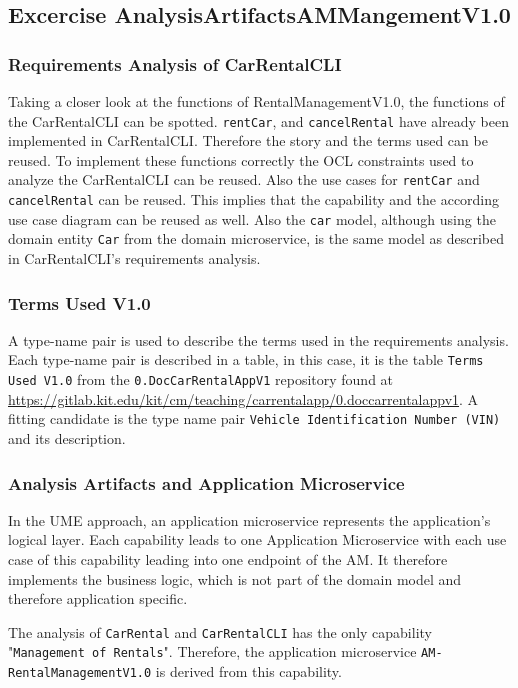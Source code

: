 \subsection{Excercise AnalysisArtifactsAMMangementV1.0}
\subsubsection*{Requirements Analysis of CarRentalCLI}
Taking a closer look at the functions of RentalManagementV1.0, the functions of the CarRentalCLI can be spotted.
\texttt{rentCar}, and \texttt{cancelRental} have already been implemented in CarRentalCLI.
Therefore the story and the terms used can be reused.
To implement these functions correctly the OCL constraints used to analyze the CarRentalCLI can be reused.
Also the use cases for \texttt{rentCar} and \texttt{cancelRental} can be reused.
This implies that the capability and the according use case diagram can be reused as well.
Also the \texttt{car} model, although using the domain entity \texttt{Car} from the domain microservice, is the same model as described in CarRentalCLI's requirements analysis.

\subsubsection*{Terms Used V1.0}
A type-name pair is used to describe the terms used in the requirements analysis.
Each type-name pair is described in a table, in this case, it is the table \texttt{Terms Used V1.0} from the \texttt{0.DocCarRentalAppV1} repository found at \url{https://gitlab.kit.edu/kit/cm/teaching/carrentalapp/0.doccarrentalappv1}.
A fitting candidate is the type name pair \texttt{Vehicle Identification Number (VIN)} and its description.
\subsubsection*{Analysis Artifacts and Application Microservice}
In the UME approach, an application microservice represents the application's logical layer.
Each capability leads to one Application Microservice with each use case of this capability leading into one endpoint of the AM.
It therefore implements the business logic, which is not part of the domain model and therefore application specific.

The analysis of \texttt{CarRental} and \texttt{CarRentalCLI} has the only capability "\texttt{Management of Rentals}".
Therefore, the application microservice \texttt{AM-RentalManagementV1.0} is derived from this capability.

